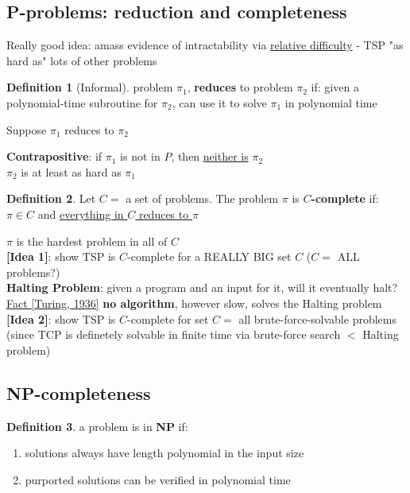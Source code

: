\documentclass[a4paper,12pt]{article}
\theoremstyle{plain}
\theoremstyle{definition}
\newtheorem*{definition}{Definition}
\theoremstyle{remark}
\begin{document}
\subsection{P-problems: reduction and completeness}
Really good idea: amass evidence of intractability via \underline{relative difficulty} - TSP "as hard as" lots of other problems

\begin{definition}
[Informal] problem $\pi_1$, \textbf{reduces} to problem $\pi_2$ if: given a polynomial-time subroutine for $\pi_2$, can use it to solve $\pi_1$ in polynomial time
\end{definition}

Suppose $\pi_1$ reduces to $\pi_2$

\textbf{Contrapositive}: if $\pi_1$ is not in $P$, then \underline{neither is} $\pi_2$
\\

$\pi_2$ is at least as hard as $\pi_1$

\begin{definition}
Let $C =$ a set of problems. The problem $\pi$ is \textbf{$C$-complete} if: $\pi \in C$ and \underline{everything in $C$ reduces to $\pi$}
\end{definition}

$\pi$ is the hardest problem in all of $C$
\\

\textbf{[Idea 1]}: show TSP is $C$-complete for a REALLY BIG set $C$ ($C =$ ALL problems?)
\\

\textbf{Halting Problem}: given a program and an input for it, will it eventually halt?
\\

\underline{Fact [Turing, 1936]} \textbf{no algorithm}, however slow, solves the Halting problem
\\

\textbf{[Idea 2]}: show TSP is $C$-complete for set $C =$ all brute-force-solvable problems (since TCP is definetely solvable in finite time via brute-force search $<$ Halting problem)



\subsection{NP-completeness}
\begin{definition}
a problem is in \textbf{NP} if:
\begin{enumerate}
	\item solutions always have length polynomial in the input size
	\item purported solutions can be verified in polynomial time
\end{enumerate}
\end{definition}
\end{document}
